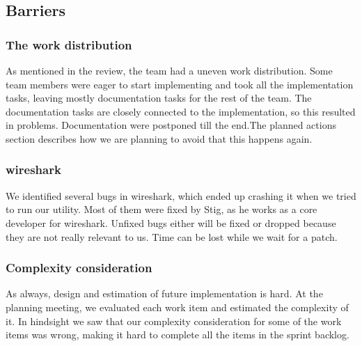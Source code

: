 \subsection{Barriers}
\subsubsection{The work distribution} 
As mentioned in the review, the team had a uneven work distribution. Some team members were eager to start implementing and took all the implementation tasks, leaving mostly documentation tasks for the rest of the team. The documentation tasks are closely connected to the implementation, so this resulted in problems. Documentation were postponed till the end.The planned actions section describes how we are planning to avoid that this happens again. 

\subsubsection{\Gls{wireshark}} 
We identified several bugs in \Gls{wireshark}, which ended up crashing it when we tried to run our \gls{utility}. Most of them were fixed by Stig, as he works as a core developer for \Gls{wireshark}. Unfixed bugs either will be fixed or dropped because they are not really relevant to us. Time can be lost while we wait for a patch.

\subsubsection{Complexity consideration}
As always, design and estimation of future implementation is hard. At the planning meeting, we evaluated each work item and estimated the complexity of it. In hindsight we saw that our complexity consideration for some of the work items was wrong, making it hard to complete all the items in the sprint backlog.
